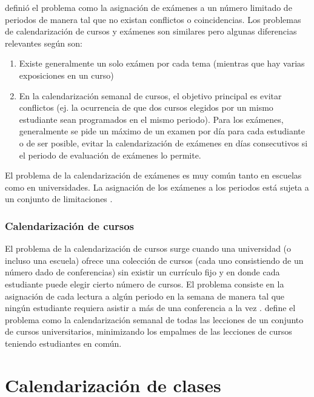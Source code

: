 \documentclass[draft,12pt,headsepline,footsepline,paper=letter]{scrreprt}
\begin{document}
\citet[p.~4]{carter95recent-developments} definió el problema como la asignación de exámenes a un número limitado de periodos de manera tal que no existan conflictos o coincidencias. Los problemas de calendarización de cursos y exámenes son similares pero algunas diferencias relevantes según \citet[p.~159]{werra85an-introduction-to-timetabling} son:
\begin{enumerate}[a]
\item Existe generalmente un solo exámen por cada tema (mientras que hay varias exposiciones en un curso)
\item En la calendarización semanal de cursos, el objetivo principal es evitar conflictos (ej. la ocurrencia de que dos cursos elegidos por un mismo estudiante sean programados en el mismo periodo). Para los exámenes, generalmente se pide un máximo de un examen por día para cada estudiante o de ser posible, evitar la calendarización de exámenes en días consecutivos si el periodo de evaluación de exámenes lo permite.
\end{enumerate}
El problema de la calendarización de exámenes es muy común tanto en escuelas como en universidades. La asignación de los exámenes a los periodos está sujeta a un conjunto de limitaciones \citep[p.~12]{abdullah06heuristic-approaches}.

\subsubsection{Calendarización de cursos}

El problema de la calendarización de cursos surge cuando una universidad (o incluso una escuela) ofrece una colección de cursos (cada uno consistiendo de un número dado de conferencias) sin existir un currículo fijo y en donde cada estudiante puede elegir cierto número de cursos. El problema consiste en la asignación de cada lectura a algún periodo en la semana de manera tal que ningún estudiante requiera asistir a más de una conferencia a la vez \citep[p.~157]{werra85an-introduction-to-timetabling}.
\citet[p.~88]{schaerf99a-survey-of-automated} define el problema como la calendarización semanal de todas las lecciones de un conjunto de cursos universitarios, minimizando los empalmes de las lecciones de cursos teniendo estudiantes en común.

\section{Calendarización de clases}
\label{calendarizacion_clases}
\end{document}
